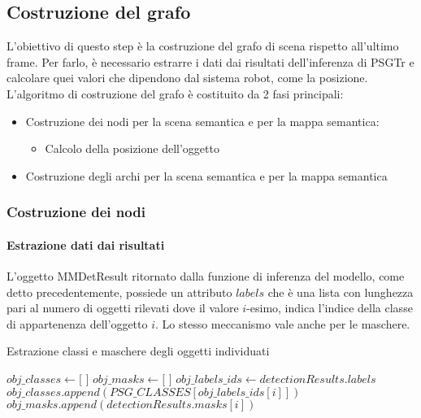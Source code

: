 \subsection{Costruzione del grafo}
L'obiettivo di questo step è la costruzione del grafo di scena rispetto all'ultimo frame. Per farlo, è necessario estrarre i dati dai risultati dell'inferenza di PSGTr e calcolare quei valori che dipendono dal sistema robot, come la posizione. 
L'algoritmo di costruzione del grafo è costituito da 2 fasi principali:
\begin{itemize}
  \item Costruzione dei nodi per la scena semantica e per la mappa semantica:
  \begin{itemize}
    \item Calcolo della posizione dell'oggetto
  \end{itemize}
  \item Costruzione degli archi per la scena semantica e per la mappa semantica
\end{itemize}

\subsubsection{Costruzione dei nodi}
\paragraph{Estrazione dati dai risultati}
L'oggetto MMDetResult ritornato dalla funzione di inferenza del modello, come detto precedentemente, possiede un attributo $labels$ che è una lista con lunghezza pari al numero di oggetti rilevati dove il valore $i$-esimo, indica l'indice della classe di appartenenza dell'oggetto $i$. Lo stesso meccanismo vale anche per le maschere.

\begin{algorithm}
  \caption{Estrazione classi e maschere degli oggetti individuati}
  \begin{algorithmic}[1]
    \State $obj\_classes \gets \text{[ ]}$
    \State $obj\_masks \gets \text{[ ]}$
    \State $obj\_labels\_ids \gets detectionResults.labels$
      \State $obj\_classes.append(PSG\_CLASSES[obj\_labels\_ids[i]])$
      \State $obj\_masks.append(detectionResults.masks[i])$
    \EndFor
  \end{algorithmic}
\end{algorithm}


